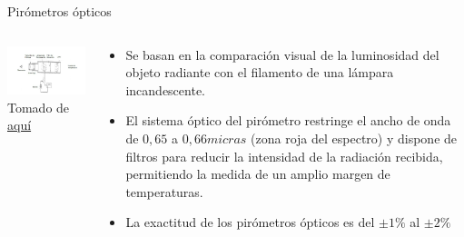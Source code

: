 \documentclass[aspectratio=169]{beamer}
\begin{document}
\begin{frame}{Pirómetros ópticos}
    \begin{columns}[c, onlytextwidth]
        \begin{column}{0.47\textwidth}
            \includegraphics[width=8.5cm]{fig/Pirometros-optico-esquema.jpg}
            \\ \tiny{Tomado de \href{https://como-funciona.co/un-pirometro/}{aquí}}
        \end{column}
        \begin{column}{0.50\textwidth}
            \begin{itemize}
                \item Se basan en la comparación visual de la luminosidad del objeto radiante con el filamento de una lámpara incandescente.
                \item El sistema óptico del pirómetro restringe el ancho de onda de $0,65$ a $0,66 micras$ (zona roja del espectro) y dispone de filtros para reducir la intensidad de la radiación recibida, permitiendo la medida de un amplio margen de temperaturas. 
                \item La exactitud de los pirómetros ópticos es del $\pm 1\%$ al $\pm2\%$ 
            \end{itemize}
        \end{column}
        
    \end{columns}
\end{frame}
\end{document}
